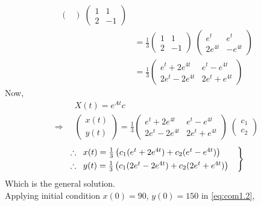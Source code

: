 \documentclass[../main-sheet.tex]{subfiles}
\begin{document}
\begin{soln}
\begin{align*}
\begin{pmatrix}
        \end{pmatrix}\;\begin{pmatrix}
            1 & 1\\
            2 & -1
        \end{pmatrix}\\
        &=\frac{1}{3}\begin{pmatrix}
            1 & 1\\
            2 & -1
        \end{pmatrix}\;\begin{pmatrix}
            e^{t} & e^{t}\\
            2e^{4t} & -e^{4t}
        \end{pmatrix}\\
        &=\frac{1}{3}\begin{pmatrix}
            e^{t}+2e^{4t} & e^{t}-e^{4t}\\
            2e^{t}-2e^{4t} & 2e^{t}+e^{4t}
        \end{pmatrix}
    \end{align*}
    Now,
    \begin{align*}
        &X(t)=e^{At}c\\
        \Rightarrow\;\;&\begin{pmatrix}
            x(t)\\
            y(t)
        \end{pmatrix}=\frac{1}{3}\begin{pmatrix}
            e^{t}+2e^{4t} & e^{t}-e^{4t}\\
            2e^{t}-2e^{4t} & 2e^{t}+e^{4t}
        \end{pmatrix}\;\begin{pmatrix}
            c_1\\
            c_2
        \end{pmatrix}
    \end{align*}
    \begin{equation}
        \begin{rcases}
            \therefore\;\;x(t)=\frac{1}{3}\left( c_1(e^t+2e^{4t})+c_2(e^t-e^{4t}) \right)\qquad \\
            \therefore\;\;y(t)=\frac{1}{3}\left( c_1(2e^t-2e^{4t})+c_2(2e^t+e^{4t})\right)
        \end{rcases}
        \label{eq:com1.2}
    \end{equation}
    Which is the general solution.\\
    Applying initial condition \(x(0)=90\), \(y(0)=150\) in \eqref{eq:com1.2},

\end{soln}
\end{document}
